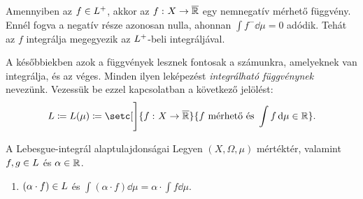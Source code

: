 \documentclass[
]{elteikthesis}[2024/04/26]
\begin{document}
	\noindent 
	Amennyiben az \( f \in L^+ \), 
	akkor az \( f \,\colon X \to \overline{\mathbb{R}} \) egy nemnegatív mérhető függvény.
	Ennél fogva a negatív része azonosan nulla, ahonnan \( \int f^- \dd{\mu} = 0 \) adódik.
	Tehát az \( f \) integrálja megegyezik az \( L^+ \)-beli integráljával.
	
	A későbbiekben azok a függvények lesznek fontosak a számunkra, 
	amelyeknek van integrálja, és az véges. 
	Minden ilyen leképezést \emph{integrálható függvénynek} nevezünk. 
	Vezessük be ezzel kapcsolatban a következő jelölést:
	\[
		\Lebesgue \coloneq \Lebesgue(\mu) \coloneq
		\setc[\Bigg]{ \func{f}{X}{\overline{\R}} }{ f \text{ mérhető és } \int f \dd{\mu} \in \R}.
	\]
	\newpage
	
	\begin{theorem}{A Lebesgue-integrál alaptulajdonságai}{}
		Legyen \( (X,\Omega,\mu) \) mértéktér, 
		valamint \( f, g \in \Lebesgue \) és \( \alpha \in \mathbb{R} \).
		\begin{enumerate}
			\item 
			\( (\alpha \cdot f) \in \Lebesgue \) 
			\quad és \quad 
			\( \displaystyle \int (\alpha \cdot f) \dd{\mu} = \alpha \cdot \int f \dd{\mu} \).
		\end{enumerate}
	\end{theorem}
		
\end{document}
